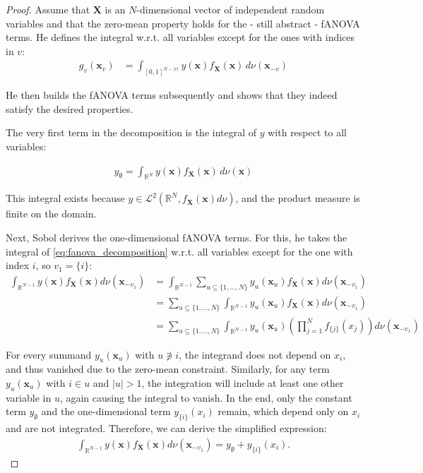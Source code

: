 \begin{proof}
    Assume that $\boldsymbol{X}$ is an $N$-dimensional vector of independent random variables and that the zero-mean property holds for the - still abstract - fANOVA terms. He defines the integral w.r.t. all variables except for the ones with indices in \( v \):
    \begin{align*}
        g_v(\boldsymbol{x}_v) &= \int_{[0, 1]^{N - |v|}} y(\boldsymbol{x}) f_{\boldsymbol{X}}(\boldsymbol{x}) \, d\nu (\boldsymbol{x}_{-v})
    \end{align*}

He then builds the fANOVA terms subsequently and shows that they indeed satisfy the desired properties.\par
The very first term in the decomposition is the integral of \( y \) with respect to all variables:

\begin{align*}
    y_{\emptyset} = \int_{\mathbb{R}^N} y(\boldsymbol{x}) f_{\boldsymbol{X}}(\boldsymbol{x}) \, d\nu(\boldsymbol{x})
\end{align*}

This integral exists because \( y \in \mathcal{L}^2(\mathbb{R}^N, f_{\boldsymbol{X}}(\boldsymbol{x}) d\nu) \), and the product measure is finite on the domain.

Next, Sobol derives the one-dimensional fANOVA terms. For this, he takes the integral of \autoref{eq:fanova_decomposition} w.r.t. all variables except for the one with index \( i \), so $v_1 = \{i\}$:
\begin{align*}
    \int_{\mathbb{R}^{N-1}} y(\boldsymbol{x}) f_{\boldsymbol{X}}(\boldsymbol{x}) d\nu (\boldsymbol{x}_{-v_1}) 
    &= \int_{\mathbb{R}^{N-1}} \sum_{u \subseteq \{1, \dots, N\}} y_{u}(\boldsymbol{x}_u) f_{\boldsymbol{X}}(\boldsymbol{x}) d\nu (\boldsymbol{x}_{-v_1}) \\
    &= \sum_{u \subseteq \{1, \dots, N\}} \int_{\mathbb{R}^{N-1}} y_{u}(\boldsymbol{x}_u) f_{\boldsymbol{X}}(\boldsymbol{x}) d\nu (\boldsymbol{x}_{-v_1}) \\
    &= \sum_{u \subseteq \{1, \dots, N\}} \int_{\mathbb{R}^{N-1}} y_{u}(\boldsymbol{x}_u) \left( \prod_{j=1}^N f_{{\{j\}}}(x_j) \right) d\nu (\boldsymbol{x}_{-v_1})
\end{align*}

For every summand \( y_u(\boldsymbol{x}_u) \) with \( u \not\ni i \), the integrand does not depend on \( x_i \), and thus vanished due to the zero-mean constraint.
Similarly, for any term \( y_u(\boldsymbol{x}_u) \) with \( i \in u \) and \( |u| > 1 \), the integration will include at least one other variable in \( u \), again causing the integral to vanish.
In the end, only the constant term \( y_{\emptyset} \) and the one-dimensional term \( y_{\{i\}}(x_i) \) remain, which depend only on \( x_i \) and are not integrated.
Therefore, we can derive the simplified expression:
\begin{align*}
    \int_{\mathbb{R}^{N-1}} y(\boldsymbol{x}) f_{\boldsymbol{X}}(\boldsymbol{x}) d\nu (\boldsymbol{x}_{-v_1}) = y_{\emptyset} + y_{\{i\}}(x_i).
\end{align*}


\end{proof}
